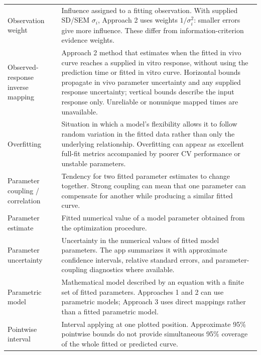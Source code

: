 \begin{longtable}{@{}>{\raggedright\arraybackslash}p{}>{\raggedright\arraybackslash}p{}@{}}
Observation weight & Influence assigned to a fitting observation. With supplied SD/SEM \(\sigma_i\), Approach 2 uses weights \(1/\sigma_i^2\): smaller errors give more influence. These differ from information-criterion evidence weights. \\

Observed-response inverse mapping & Approach 2 method that estimates when the fitted in vivo curve reaches a supplied in vitro response, without using the prediction time or fitted in vitro curve. Horizontal bounds propagate in vivo parameter uncertainty and any supplied response uncertainty; vertical bounds describe the input response only. Unreliable or nonunique mapped times are unavailable. \\

Overfitting & Situation in which a model's flexibility allows it to follow random variation in the fitted data rather than only the underlying relationship. Overfitting can appear as excellent full-fit metrics accompanied by poorer CV performance or unstable parameters. \\

Parameter coupling / correlation & Tendency for two fitted parameter estimates to change together. Strong coupling can mean that one parameter can compensate for another while producing a similar fitted curve. \\

Parameter estimate & Fitted numerical value of a model parameter obtained from the optimization procedure. \\


Parameter uncertainty & Uncertainty in the numerical values of fitted model parameters. The app summarizes it with approximate confidence intervals, relative standard errors, and parameter-coupling diagnostics where available. \\

Parametric model & Mathematical model described by an equation with a finite set of fitted parameters. Approaches 1 and 2 can use parametric models; Approach 3 uses direct mappings rather than a fitted parametric model. \\

Pointwise interval & Interval applying at one plotted position. Approximate 95\% pointwise bounds do not provide simultaneous 95\% coverage of the whole fitted or predicted curve. \\


\end{longtable}
